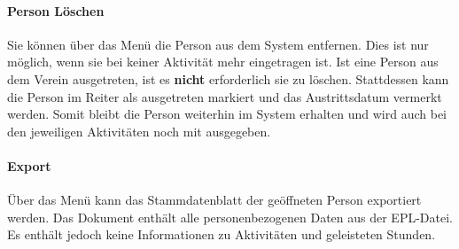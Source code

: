 \paragraph{Person Löschen}
Sie können über das Menü  die Person aus dem System entfernen.
Dies ist nur möglich, wenn sie bei keiner Aktivität mehr eingetragen ist.
Ist eine Person aus dem Verein ausgetreten, ist es \textbf{nicht} erforderlich sie zu löschen.
Stattdessen kann die Person im Reiter  als ausgetreten markiert und das Austrittsdatum vermerkt werden.
Somit bleibt die Person weiterhin im System erhalten und wird auch bei den jeweiligen Aktivitäten noch mit ausgegeben.


\paragraph{Export}
Über das Menü  kann das Stammdatenblatt der geöffneten Person exportiert werden.
Das Dokument enthält alle personenbezogenen Daten aus der EPL-Datei.
Es enthält jedoch keine Informationen zu Aktivitäten und geleisteten Stunden.

